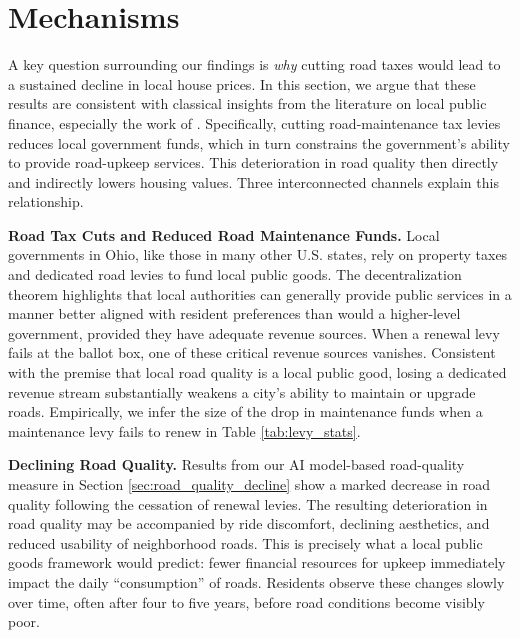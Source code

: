 \section{Mechanisms} \label{sec:mech}

A key question surrounding our findings is \textit{why} cutting road taxes would lead to a sustained decline in local house prices. In this section, we argue that these results are consistent with classical insights from the literature on local public finance, especially the work of \cite{Oates1972}. Specifically, cutting road-maintenance tax levies reduces local government funds, which in turn constrains the government’s ability to provide road-upkeep services. This deterioration in road quality then directly and indirectly lowers housing values. Three interconnected channels explain this relationship.

{\bf Road Tax Cuts and Reduced Road Maintenance Funds.} Local governments in Ohio, like those in many other U.S. states, rely on property taxes and dedicated road levies to fund local public goods. The \cite{Oates1972} decentralization theorem highlights that local authorities can generally provide public services in a manner better aligned with resident preferences than would a higher-level government, provided they have adequate revenue sources. When a renewal levy fails at the ballot box, one of these critical revenue sources vanishes. Consistent with the premise that local road quality is a local public good, losing a dedicated revenue stream substantially weakens a city’s ability to maintain or upgrade roads. Empirically, we infer the size of the drop in maintenance funds when a maintenance levy fails to renew in Table \ref{tab:levy_stats}.


{\bf Declining Road Quality.} Results from our AI model-based road-quality measure in Section \ref{sec:road_quality_decline} show a marked decrease in road quality following the cessation of renewal levies. The resulting deterioration in road quality may be accompanied by ride discomfort, declining aesthetics, and reduced usability of neighborhood roads. This is precisely what a local public goods framework would predict: fewer financial resources for upkeep immediately impact the daily “consumption” of roads. Residents observe these changes slowly over time, often after four to five years, before road conditions become visibly poor.

